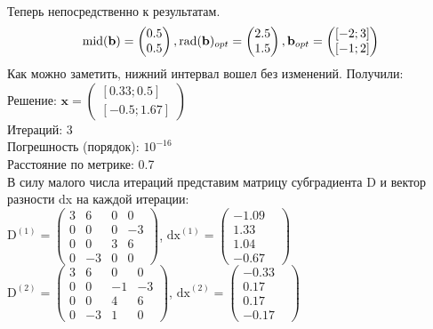 \documentclass[../body.tex]{subfiles}
\begin{document}
\\Теперь непосредственно к результатам.
\begin{equation}
	   \\\textrm{mid}(\textbf{b}) = \begin{pmatrix}
        0.5\\
        0.5
        \end{pmatrix}, \textrm{rad}(\textbf{b})_{opt} = \begin{pmatrix}
        2.5\\
        1.5
        \end{pmatrix}, \textbf{b}_{opt} = \begin{pmatrix}
        [-2;3]\\
        [-1;2]
        \end{pmatrix}
        \label{vec_1}
	\end{equation}
Как можно заметить, нижний интервал вошел без изменений. Получили:
\\Решение: $\textbf{x} = \begin{pmatrix}
        [0.33;0.5]\\
        [-0.5;1.67]
        \end{pmatrix}$
\\Итераций: 3
\\Погрешность (порядок): $10^{-16}$
\\Расстояние по метрике: 0.7
\\В силу малого числа итераций представим матрицу субградиента D и вектор разности dx на каждой итерации:
\\$\textrm{D}^{(1)} = \begin{pmatrix}
        3& 6& 0& 0\\
        0& 0& 0& -3\\
        0& 0& 3& 6\\
        0& -3& 0& 0
        \end{pmatrix}$, $\textrm{dx}^{(1)} = \begin{pmatrix}
        -1.09&\\
        1.33&\\
        1.04&\\
        -0.67&
        \end{pmatrix}$
\\$\textrm{D}^{(2)} = \begin{pmatrix}
        3& 6& 0& 0\\
        0& 0& -1& -3\\
        0& 0& 4& 6\\
        0& -3& 1& 0
        \end{pmatrix}$, $\textrm{dx}^{(2)} = \begin{pmatrix}
        -0.33&\\
        0.17&\\
        0.17&\\
        -0.17&
        \end{pmatrix}$
\end{document}
